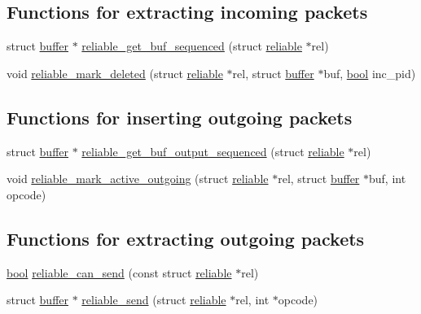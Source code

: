 \subsection*{Functions for extracting incoming packets}
\begin{DoxyCompactItemize}
\item 
struct \hyperlink{structbuffer}{buffer} $\ast$ \hyperlink{group__reliable_ga08f53328657f0172eb061193171e2a41}{reliable\+\_\+get\+\_\+buf\+\_\+sequenced} (struct \hyperlink{structreliable}{reliable} $\ast$rel)
\item 
void \hyperlink{group__reliable_ga5c51920665fa9c34f082dd7aa6ce0e55}{reliable\+\_\+mark\+\_\+deleted} (struct \hyperlink{structreliable}{reliable} $\ast$rel, struct \hyperlink{structbuffer}{buffer} $\ast$buf, \hyperlink{automatic_8c_abb452686968e48b67397da5f97445f5b}{bool} inc\+\_\+pid)
\end{DoxyCompactItemize}
\subsection*{Functions for inserting outgoing packets}
\begin{DoxyCompactItemize}
\item 
struct \hyperlink{structbuffer}{buffer} $\ast$ \hyperlink{group__reliable_gaa15b0672f4ddd65d55194ed5bde0e1c8}{reliable\+\_\+get\+\_\+buf\+\_\+output\+\_\+sequenced} (struct \hyperlink{structreliable}{reliable} $\ast$rel)
\item 
void \hyperlink{group__reliable_ga2c03b5ae47fe72dbf4fe16f11ea1c091}{reliable\+\_\+mark\+\_\+active\+\_\+outgoing} (struct \hyperlink{structreliable}{reliable} $\ast$rel, struct \hyperlink{structbuffer}{buffer} $\ast$buf, int opcode)
\end{DoxyCompactItemize}
\subsection*{Functions for extracting outgoing packets}
\begin{DoxyCompactItemize}
\item 
\hyperlink{automatic_8c_abb452686968e48b67397da5f97445f5b}{bool} \hyperlink{group__reliable_ga79e86f7694ffbd592d944f8f45efa7c8}{reliable\+\_\+can\+\_\+send} (const struct \hyperlink{structreliable}{reliable} $\ast$rel)
\item 
struct \hyperlink{structbuffer}{buffer} $\ast$ \hyperlink{group__reliable_gaebcf7ae7a144f32b55c9af5c51121ec1}{reliable\+\_\+send} (struct \hyperlink{structreliable}{reliable} $\ast$rel, int $\ast$opcode)
\end{DoxyCompactItemize}
